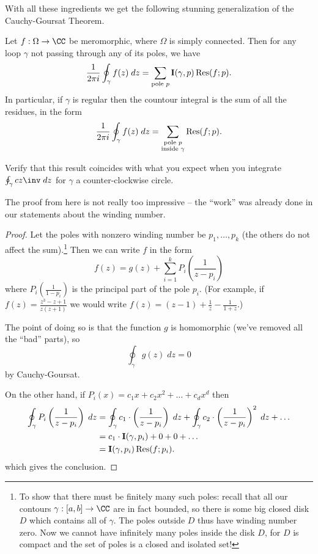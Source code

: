 With all these ingredients we get the following stunning generalization of the Cauchy-Goursat Theorem.
\begin{theorem}
	Let $f : \Omega \to \CC$ be meromorphic, where $\Omega$ is simply connected.
	Then for any loop $\gamma$ not passing through any of its poles, we have
	\[
		\frac{1}{2\pi i} \oint_{\gamma} f(z) \; dz
		= \sum_{\text{pole $p$}} \operatorname{\mathbf I}(\gamma, p) \operatorname{Res}(f; p).
	\]
	In particular, if $\gamma$ is regular then the countour integral is the sum of all the residues, in the form
	\[
		\frac{1}{2\pi i} \oint_{\gamma} f(z) \; dz
		= \sum_{\substack{\text{pole $p$} \\ \text{inside $\gamma$}}}  \operatorname{Res}(f; p).
	\]
\end{theorem}
\begin{ques}
	Verify that this result coincides
	with what you expect when you integrate $\oint_\gamma cz\inv \; dz$
	for $\gamma$ a counter-clockwise circle.
\end{ques}

The proof from here is not really too impressive -- the ``work'' was already
done in our statements about the winding number.
\begin{proof}
	Let the poles with nonzero winding number be $p_1, \dots, p_k$ (the others do not affect the sum).\footnote{
		To show that there must be finitely many such poles: recall that all our contours $\gamma : [a,b] \to \CC$
		are in fact bounded, so there is some big closed disk $D$ which contains all of $\gamma$.
		The poles outside $D$ thus have winding number zero.
		Now we cannot have infinitely many poles inside the disk $D$, for $D$ is compact and the
		set of poles is a closed and isolated set!}
	Then we can write $f$ in the form
	\[
		f(z) = g(z) + \sum_{i=1}^k P_i\left( \frac{1}{z-p_i} \right)
	\]
	where $P_i\left( \frac{1}{1-p_i} \right)$ is the principal part of the pole $p_i$.
	(For example, if $f(z) = \frac{z^3-z+1}{z(z+1)}$ we would write $f(z) = (z-1) + \frac1z - \frac1{1+z}$.)

	The point of doing so is that the function $g$ is homomorphic (we've removed all the ``bad'' parts), so 
	\[ \oint_{\gamma} g(z) \; dz = 0 \]
	by Cauchy-Goursat.

	On the other hand, if $P_i(x) = c_1x + c_2x^2 + \dots + c_d x^d$ then
	\begin{align*}
		\oint_{\gamma} P_i\left( \frac{1}{z-p_i} \right) \; dz
		&=
		\oint_{\gamma} c_1 \cdot \left( \frac{1}{z-p_i} \right) \; dz
		+ \oint_{\gamma} c_2 \cdot \left( \frac{1}{z-p_i} \right)^2 \; dz
		+ \dots \\
		&= c_1 \cdot \operatorname{\mathbf I}(\gamma, p_i) + 0 + 0 + \dots \\
		&= \operatorname{\mathbf I}(\gamma, p_i) \operatorname{Res}(f; p_i).
	\end{align*}
	which gives the conclusion.
\end{proof}

